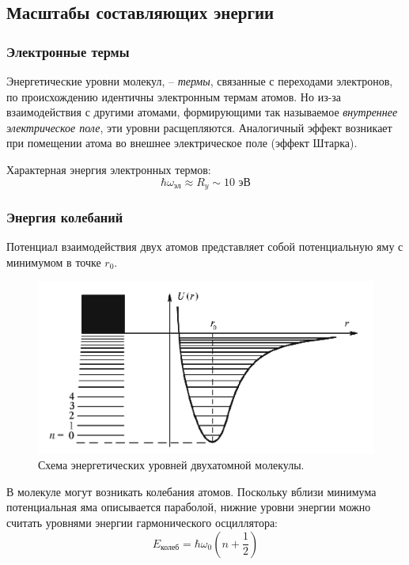 \documentclass[12pt,a4paper]{article}
\begin{document}
	\subsection*{Масштабы составляющих энергии}
	
	\subsubsection*{Электронные термы}
	
	Энергетические уровни молекул, -- \textit{термы}, связанные с переходами электронов, по происхождению идентичны электронным термам атомов. Но из-за взаимодействия с другими атомами, формирующими так называемое \textit{внутреннее электрическое поле}, эти уровни расщепляются. Аналогичный эффект возникает при помещении атома во внешнее электрическое поле (эффект Штарка).
	
	Характерная энергия электронных термов:
	\begin{equation}
		\hbar \omega_{\text{эл}} \approx R_y \sim 10 \text{ эВ}
	\end{equation}
	
	\subsubsection*{Энергия колебаний}
	
	Потенциал взаимодействия двух атомов представляет собой потенциальную яму с минимумом в точке $r_0$.
	
	\begin{figure}[H]
		\centering
		\includegraphics[width=0.6\linewidth]{res/ocsillation_levels.png}
		\caption{Схема энергетических уровней двухатомной молекулы.}
		\label{fig:oscillation_levels}
	\end{figure}
	
	В молекуле могут возникать колебания атомов. Поскольку вблизи минимума потенциальная яма описывается параболой, нижние уровни энергии можно считать уровнями энергии гармонического осциллятора:
	\begin{equation}
		E_{\text{колеб}} = \hbar \omega_0 (n + \frac{1}{2})
	\end{equation}
	
\end{document}

